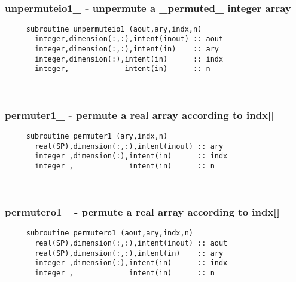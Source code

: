  
\mbox{}\hrulefill\ 

  \subsubsection{unpermuteio1\_ - unpermute a \_permuted\_ integer array}

\begin{verbatim} 
     subroutine unpermuteio1_(aout,ary,indx,n)
       integer,dimension(:,:),intent(inout) :: aout
       integer,dimension(:,:),intent(in)    :: ary
       integer,dimension(:),intent(in)      :: indx
       integer,             intent(in)      :: n
 \end{verbatim}%
 
 
\mbox{}\hrulefill\ 
 
  \subsubsection{permuter1\_ - permute a real array according to indx[]}

\begin{verbatim} 
     subroutine permuter1_(ary,indx,n)
       real(SP),dimension(:,:),intent(inout) :: ary
       integer ,dimension(:),intent(in)      :: indx
       integer ,             intent(in)      :: n
 \end{verbatim}%
 
 
\mbox{}\hrulefill\ 
 
  \subsubsection{permutero1\_ - permute a real array according to indx[]}

\begin{verbatim} 
     subroutine permutero1_(aout,ary,indx,n)
       real(SP),dimension(:,:),intent(inout) :: aout
       real(SP),dimension(:,:),intent(in)    :: ary
       integer ,dimension(:),intent(in)      :: indx
       integer ,             intent(in)      :: n
 \end{verbatim}%
 
